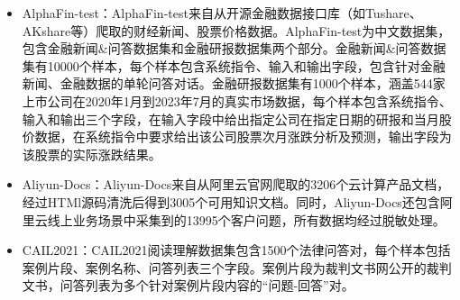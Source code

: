 \begin{itemize}[topsep = 0 pt, itemsep= 0 pt, parsep=0pt, partopsep=0pt, leftmargin=36pt, itemindent=0pt, labelsep=6pt, listparindent=24pt]

	\item AlphaFin-test：AlphaFin-test来自从开源金融数据接口库（如Tushare\cite{tushare}、AKshare\cite{akshare}等）爬取的财经新闻、股票价格数据。AlphaFin-test为中文数据集，包含金融新闻\&问答数据集和金融研报数据集两个部分。金融新闻\&问答数据集有10000个样本，每个样本包含系统指令、输入和输出字段，包含针对金融新闻、金融数据的单轮问答对话。金融研报数据集有1000个样本，涵盖544家上市公司在2020年1月到2023年7月的真实市场数据，每个样本包含系统指令、输入和输出三个字段，在输入字段中给出指定公司在指定日期的研报和当月股价数据，在系统指令中要求给出该公司股票次月涨跌分析及预测，输出字段为该股票的实际涨跌结果。
	
	\item Aliyun-Docs：Aliyun-Docs来自从阿里云官网爬取的3206个云计算产品文档，经过HTMl源码清洗后得到3005个可用知识文档。同时，Aliyun-Docs还包含阿里云线上业务场景中采集到的13995个客户问题，所有数据均经过脱敏处理。
	
	\item CAIL2021：CAIL2021阅读理解数据集包含1500个法律问答对，每个样本包括案例片段、案例名称、问答列表三个字段。案例片段为裁判文书网公开的裁判文书，问答列表为多个针对案例片段内容的“问题-回答”对。
\end{itemize}




